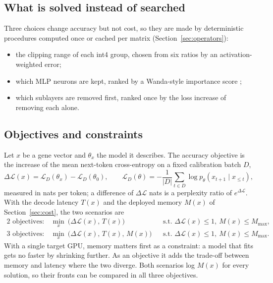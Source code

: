 \documentclass[11pt]{article}
\newcommand{\dloss}{\Delta\mathcal{L}}
\begin{document}
\subsection{What is solved instead of searched}
Three choices change accuracy but not cost, so they are made by deterministic procedures computed once
or cached per matrix (Section~\ref{sec:operators}):
\begin{itemize}
  \item the clipping range of each int4 group, chosen from six ratios by an activation-weighted error;
  \item which MLP neurons are kept, ranked by a Wanda-style importance score \cite{sun2024wanda};
  \item which sublayers are removed first, ranked once by the loss increase of removing each alone.
\end{itemize}

\subsection{Objectives and constraints}
Let $x$ be a gene vector and $\theta_x$ the model it describes. The accuracy objective is the increase
of the mean next-token cross-entropy on a fixed calibration batch $D$,
\begin{equation}
  \dloss(x) = \mathcal{L}_D(\theta_x) - \mathcal{L}_D(\theta_0),\qquad
  \mathcal{L}_D(\theta) = -\frac{1}{|D|}\sum_{t\in D}\log p_\theta(x_{t+1}\mid x_{\le t}),
\end{equation}
measured in nats per token; a difference of $\dloss$ nats is a perplexity ratio of $e^{\dloss}$. With
the decode latency $T(x)$ and the deployed memory $M(x)$ of Section~\ref{sec:cost}, the two scenarios are
\begin{align}
  \text{2 objectives:}\quad & \min_x\ \big(\dloss(x),\,T(x)\big)
     && \text{s.t. } \dloss(x)\le1,\ M(x)\le M_{\max}, \\
  \text{3 objectives:}\quad & \min_x\ \big(\dloss(x),\,T(x),\,M(x)\big)
     && \text{s.t. } \dloss(x)\le1,\ M(x)\le M_{\max}.
\end{align}
With a single target GPU, memory matters first as a constraint: a model that fits gets no faster by
shrinking further. As an objective it adds the trade-off between memory and latency where the two
diverge. Both scenarios log $M(x)$ for every solution, so their fronts can be compared in all three
objectives.

\end{document}

